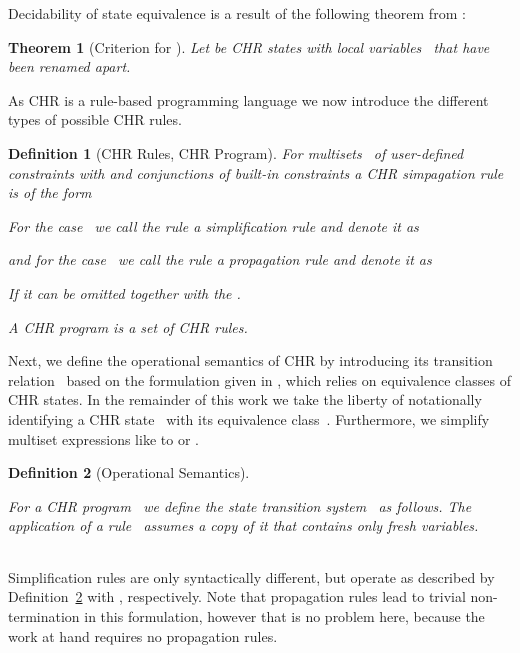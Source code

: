 \documentclass{tlp}
\newtheorem{theorem}{Theorem}\newtheorem{corollary}[theorem]{Corollary}
\newtheorem{definition}{Definition}[section]
\begin{document}
Decidability of state equivalence is a result of the following theorem from
\cite{Raiser2009a}:

\begin{theorem}[Criterion for  \cite{Raiser2009a}]\label{thm:equiv_tf} Let
 be CHR states with
local variables~ that have been renamed apart.
\end{theorem}

As CHR is a rule-based programming language we now introduce the different
types of possible CHR rules.

\begin{definition}[CHR Rules, CHR Program]\label{def:rules}
For multisets~ of user-defined constraints with  and conjunctions  of built-in constraints a CHR
\emph{simpagation} rule is of the form

For the case~ we call the rule a \emph{simplification} rule
and denote it as

and for the case~ we call the rule a \emph{propagation} rule
and denote it as

If  it can be omitted together with the .

A \emph{CHR program} is a set of CHR rules.
\end{definition}

Next, we define the operational semantics of CHR by introducing its transition
relation~ based on the formulation given in \cite{Raiser2009a}, which
relies on equivalence classes of CHR states. In the remainder of this work we
take the liberty of notationally identifying a CHR state~ with its
equivalence class~. Furthermore, we simplify multiset expressions like
 to  or .

\begin{definition}[Operational Semantics] \label{def:opsem}

For a CHR program~ we define the state transition
system~ as follows. The application of a rule~ assumes a copy of it that contains only fresh variables.

\begin{center}
\textwidth 9.5cm
\begin{tabular}{c}
 \\
\hline

\end{tabular}
\end{center}
\end{definition}

Simplification rules are only syntactically different, but operate as described
by Definition~\ref{def:opsem} with , respectively. Note that
propagation rules lead to trivial non-termination in this formulation, however
that is no problem here, because the work at hand requires no propagation rules.
\end{document}
